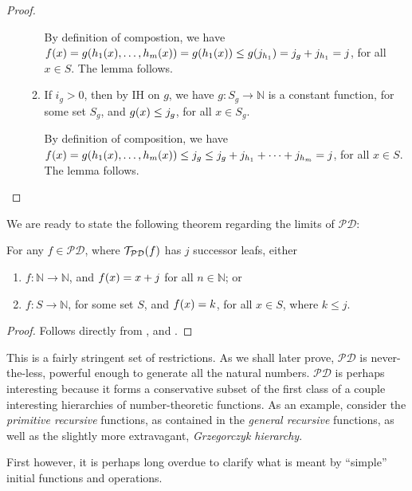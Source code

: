 \begin{proof}
\begin{enumerate}[label=(\arabic*)]
\begin{enumerate}[label=(\alph*)]
By definition of compostion, we have $f{\mathopen{}\left({x}\right)\mathclose{}}  = g{\mathopen{}\left({h_1{\mathopen{}\left({x}\right)\mathclose{}}, \ldots, h_m{\mathopen{}\left({x}\right)\mathclose{}}}\right)\mathclose{}}
= g{\mathopen{}\left({h_1{\mathopen{}\left({x}\right)\mathclose{}}}\right)\mathclose{}} \leq g{\mathopen{}\left({j_{h_1}}\right)\mathclose{}} = j_g + j_{h_1} = j$, for all $x \in S$. The
lemma follows.

\item If $i_g > 0$, then by IH on $g$, we have $g : S_g \rightarrow \mathbb{N}$
is a constant function, for some set $S_g$, and $g{\mathopen{}\left({x}\right)\mathclose{}} \leq j_g$, for all $x
\in S_g$.

By definition of composition, we have $f{\mathopen{}\left({x}\right)\mathclose{}} = g{\mathopen{}\left({h_1{\mathopen{}\left({x}\right)\mathclose{}},
\ldots, h_m{\mathopen{}\left({x}\right)\mathclose{}}}\right)\mathclose{}} \leq j_g \leq j_g + j_{h_1} + \cdots + j_{h_m} = j$, for all
$x \in S$. The lemma follows.

\end{enumerate}\end{enumerate}\end{proof}

We are ready to state the following theorem regarding the limits of
$\mathcal{PD}$:

\begin{theorem} For any $f \in \mathcal{PD}$, where
$\mathcal{T}_\mathcal{PD}{\mathopen{}\left({f}\right)\mathclose{}}$ has $j$ successor leafs,
either\begin{enumerate}[label=(\arabic*)]

\item $f : \mathbb{N} \rightarrow \mathbb{N}$, and $f{\mathopen{}\left({x}\right)\mathclose{}} = x+j$ for all $n
\in \mathbb{N}$; or

\item $f : S \rightarrow \mathbb{N}$, for some set $S$, and $f{\mathopen{}\left({x}\right)\mathclose{}} = k$, for
all $x \in S$, where $k \leq j$.

\end{enumerate}\end{theorem}

\begin{proof} Follows directly from , and
. \end{proof}

This is a fairly stringent set of restrictions. As we shall later prove,
$\mathcal{PD}$ is never-the-less, powerful enough to generate all the natural
numbers. $\mathcal{PD}$ is perhaps interesting because it forms a conservative
subset of the first class of a couple interesting hierarchies of
number-theoretic functions. As an example, consider the \emph{primitive
recursive} functions, as contained in the \emph{general recursive} functions,
as well as the slightly more extravagant, \emph{Grzegorczyk hierarchy}.

First however, it is perhaps long overdue to clarify what is meant by
``simple'' initial functions and operations.

